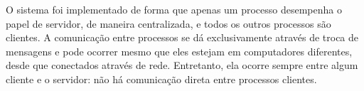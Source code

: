 \documentclass[../main.tex]{subfiles}
\begin{document}
O sistema foi implementado de forma que apenas um processo desempenha o papel de servidor, de maneira centralizada, e todos os outros processos são clientes.
A comunicação entre processos se dá exclusivamente através de troca de mensagens e pode ocorrer mesmo que eles estejam em computadores diferentes, desde que conectados através de rede.
Entretanto, ela ocorre sempre entre algum cliente e o servidor: não há comunicação direta entre processos clientes.
\end{document}
